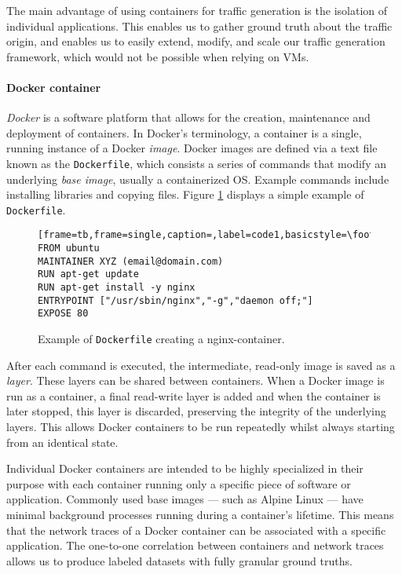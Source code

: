 \documentclass[sigconf]{acmart}
\begin{document}
The main advantage of using containers for traffic generation is the isolation of individual applications. This enables us to gather ground truth about the traffic origin, and enables us to easily extend, modify, and scale our traffic generation framework, which would not be possible when relying on VMs.

 



\paragraph*{Docker container}


\textit{Docker} is a software platform that allows for the creation, maintenance and deployment of containers. In Docker's terminology, a container is a single, running instance of a Docker \textit{image}. Docker images are defined via a text file known as the \texttt{Dockerfile}, which consists a series of commands that modify an underlying \textit{base image}, usually a containerized OS. Example commands include installing libraries and copying files. Figure \ref{fig:dockerfile} displays a simple example of \texttt{Dockerfile}.


\begin{figure}
\begin{lstlisting}[frame=tb,frame=single,caption=,label=code1,basicstyle=\footnotesize]
FROM ubuntu
MAINTAINER XYZ (email@domain.com)
RUN apt-get update
RUN apt-get install -y nginx
ENTRYPOINT ["/usr/sbin/nginx","-g","daemon off;"]
EXPOSE 80
\end{lstlisting}
 \caption{Example of \texttt{Dockerfile} creating a nginx-container.}
 \label{fig:dockerfile}
\end{figure}

After each command is executed, the intermediate, read-only image is saved as a \textit{layer}. These layers can be shared between containers. When a Docker image is run as a container, a final read-write layer is added and when the container is later stopped, this layer is discarded, preserving the integrity of the underlying layers. This allows Docker containers to be run repeatedly whilst always starting from an identical state. 


Individual Docker containers are intended to be highly specialized in their purpose with each container running only a specific piece of software or application. Commonly used base images --- such as Alpine Linux --- have minimal background processes running during a container's lifetime. This means that the network traces of a Docker container can be associated with a specific application. The one-to-one correlation between containers and network traces allows us to produce labeled datasets with fully granular ground truths.
\end{document}
